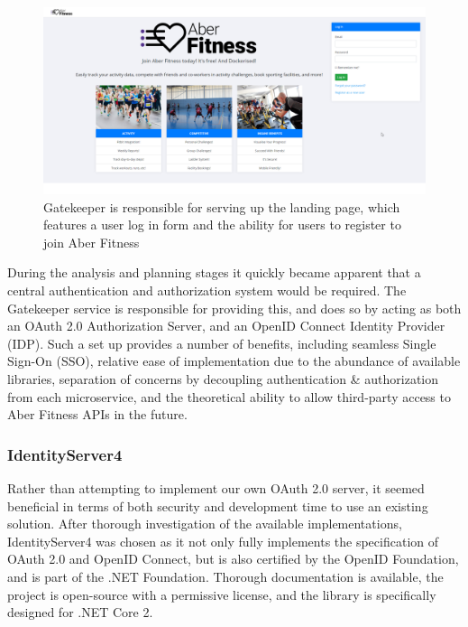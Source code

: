 \begin{figure}[H]
    \centering
    \includegraphics[width=\textwidth]{Images/service_landing_page.png}
    \caption{Gatekeeper is responsible for serving up the landing page, which features a user log in form and the ability for users to register to join Aber Fitness}
\end{figure}

During the analysis and planning stages it quickly became apparent that a central authentication and authorization system would be required. The Gatekeeper service is responsible for providing this, and does so by acting as both an OAuth 2.0 Authorization Server, and an OpenID Connect Identity Provider (IDP). Such a set up provides a number of benefits, including seamless Single Sign-On (SSO), relative ease of implementation due to the abundance of available libraries, separation of concerns by decoupling authentication \& authorization from each microservice, and the theoretical ability to allow third-party access to Aber Fitness APIs in the future.

\subsubsection{IdentityServer4}

Rather than attempting to implement our own OAuth 2.0 server, it seemed beneficial in terms of both security and development time to use an existing solution. After thorough investigation of the available implementations, IdentityServer4\cite{identityserver4} was chosen as it not only fully implements the specification of OAuth 2.0 and OpenID Connect, but is also certified by the OpenID Foundation, and is part of the .NET Foundation\cite{identityserver4docs}. Thorough documentation is available, the project is open-source with a permissive license, and the library is specifically designed for .NET Core 2.

